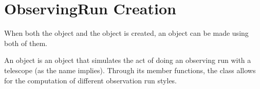 \documentclass[letterpaper,10pt,english]{sphinxmanual}
\begin{document}
%
\begin{sphinxVerbatim}[commandchars=\\\{\}]
   
   

   

  

    
\end{sphinxVerbatim}


\section{ObservingRun Creation}
\label{\detokenize{quickstart:observingrun-creation}}
When both the {\hyperref[\detokenize{model_observing:model_observing.ProtostarModel}]{}} object and the {\hyperref[\detokenize{model_observing:model_observing.Sightline}]{}} object is created, an {\hyperref[\detokenize{model_observing:model_observing.ObservingRun}]{}} object can be made using both of them.

An {\hyperref[\detokenize{model_observing:model_observing.ObservingRun}]{}} object is an object that simulates the act of doing an observing run with a telescope (as the name implies). Through its member functions, the class allows for the computation of different observation run styles.
\end{document}
